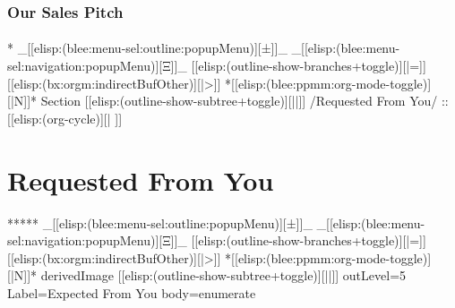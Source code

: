 \begin{whenOrg}
\begin{verblatex}

\begin{frame}[fragile,label=part_salesPitch]
    \frametitle{Our Sales Pitch}
    \framesubtitle{}

    \tableofcontents


\end{frame}
\end{verblatex}


\begin{whenOrg}
*  _[[elisp:(blee:menu-sel:outline:popupMenu)][±]]_ _[[elisp:(blee:menu-sel:navigation:popupMenu)][Ξ]]_ [[elisp:(outline-show-branches+toggle)][|=]] [[elisp:(bx:orgm:indirectBufOther)][|>]] *[[elisp:(blee:ppmm:org-mode-toggle)][|N]]*  Section    [[elisp:(outline-show-subtree+toggle)][||]]   /Requested From You/ ::  [[elisp:(org-cycle)][| ]]
\end{whenOrg}

\section{Requested From You}


\begin{whenOrg}
*****  _[[elisp:(blee:menu-sel:outline:popupMenu)][±]]_ _[[elisp:(blee:menu-sel:navigation:popupMenu)][Ξ]]_ [[elisp:(outline-show-branches+toggle)][|=]] [[elisp:(bx:orgm:indirectBufOther)][|>]] *[[elisp:(blee:ppmm:org-mode-toggle)][|N]]*  derivedImage [[elisp:(outline-show-subtree+toggle)][||]] outLevel=5 Label=Expected From You  body=enumerate
\end{whenOrg}

\begin{htmlonly}


\end{htmlonly}
\end{whenOrg}
